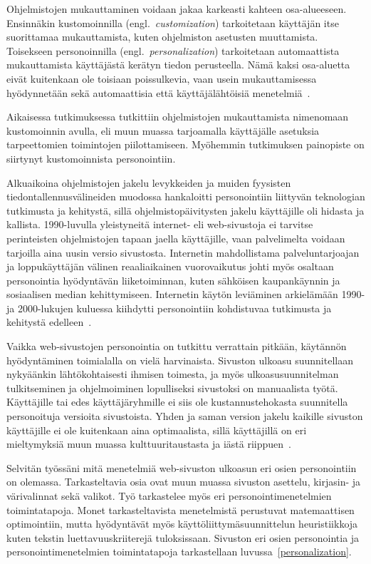 \documentclass[finnish, 12pt, a4paper, elec, utf8, a-1b, online]{aaltothesis}
\begin{document}
Ohjelmistojen mukauttaminen voidaan jakaa karkeasti kahteen osa-alueeseen.
Ensinnäkin kustomoinnilla (engl.~\textit{customization}) tarkoitetaan käyttäjän
itse suorittamaa mukauttamista, kuten ohjelmiston asetusten muuttamista.
Toisekseen personoinnilla (engl.~\textit{personalization}) tarkoitetaan
automaattista mukauttamista käyttäjästä kerätyn tiedon perusteella. Nämä kaksi
osa-aluetta eivät kuitenkaan ole toisiaan poissulkevia, vaan usein
mukauttamisessa hyödynnetään sekä automaattisia että käyttäjälähtöisiä
menetelmiä~\cite{10.1145/633292.633483}.

Aikaisessa tutkimuksessa tutkittiin ohjelmistojen mukauttamista nimenomaan
kustomoinnin avulla, eli muun muassa tarjoamalla käyttäjälle asetuksia
tarpeettomien toimintojen piilottamiseen. Myöhemmin tutkimuksen painopiste on
siirtynyt kustomoinnista personointiin.

Alkuaikoina ohjelmistojen jakelu levykkeiden ja muiden fyysisten
tiedontallennusvälineiden muodossa hankaloitti personointiin liittyvän
teknologian tutkimusta ja kehitystä, sillä ohjelmistopäivitysten jakelu
käyttäjille oli hidasta ja kallista. 1990-luvulla yleistyneitä internet- eli
web-sivustoja ei tarvitse perinteisten ohjelmistojen tapaan jaella käyttäjille,
vaan palvelimelta voidaan tarjoilla aina uusin versio sivustosta. Internetin
mahdollistama palveluntarjoajan ja loppukäyttäjän välinen reaaliaikainen
vuorovaikutus johti myös osaltaan personointia hyödyntävän liiketoiminnan, kuten
sähköisen kaupankäynnin ja sosiaalisen median kehittymiseen. Internetin käytön
leviäminen arkielämään 1990- ja 2000-lukujen kuluessa kiihdytti personointiin
kohdistuvaa tutkimusta ja kehitystä edelleen~\cite{10.1108/03090560710737534}.

Vaikka web-sivustojen personointia on tutkittu verrattain pitkään, käytännön
hyödyntäminen toimialalla on vielä harvinaista. Sivuston ulkoasu suunnitellaan
nykyäänkin lähtökohtaisesti ihmisen toimesta, ja myös ulkoasusuunnitelman
tulkitseminen ja ohjelmoiminen lopulliseksi sivustoksi on manuaalista työtä.
Käyttäjille tai edes käyttäjäryhmille ei siis ole kustannustehokasta suunnitella
personoituja versioita sivustoista. Yhden ja saman version jakelu kaikille
sivuston käyttäjille ei ole kuitenkaan aina optimaalista, sillä käyttäjillä on
eri mieltymyksiä muun muassa kulttuuritaustasta ja iästä
riippuen~\cite{10.1145/2556288.2557052}.

Selvitän työssäni mitä menetelmiä web-sivuston ulkoasun eri osien personointiin
on olemassa. Tarkasteltavia osia ovat muun muassa sivuston asettelu, kirjasin-
ja värivalinnat sekä valikot. Työ tarkastelee myös eri personointimenetelmien
toimintatapoja. Monet tarkasteltavista menetelmistä perustuvat matemaattisen
optimointiin, mutta hyödyntävät myös käyttöliittymäsuunnittelun heuristiikkoja
kuten tekstin luettavuuskriiterejä tuloksissaan. Sivuston eri osien personointia
ja personointimenetelmien toimintatapoja tarkastellaan
luvussa~\ref{personalization}.
\end{document}
